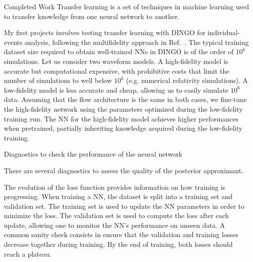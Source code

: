 \documentclass[11pt,a4paper,oneside]{book}
\numberwithin{equation}{chapter}
\numberwithin{table}{chapter}
\numberwithin{figure}{chapter}
\begin{document}
\begin{chapter}{Completed Work}
Transfer learning is a set of techniques in machine learning used to transfer knowledge from one neural network to another.

My first projects involves testing transfer learning with DINGO for individual-events analysis, following the multifidelity approach in Ref.~\cite{2025arXiv250208416K}.
The typical training dataset size required to obtain well-trained NNs in DINGO is of the order of $10^{6}$ simulations.
Let us consider two waveform models.
A high-fidelity model is accurate but computational expensive, with prohibitive costs that limit the number of simulations to well below $10^{6}$ (e.g. numerical relativity simulations).
A low-fidelity model is less accurate and cheap, allowing us to easily simulate $10^{6}$ data.
Assuming that the flow architecture is the same in both cases, we fine-tune the high-fidelity network using the parameters optimized during the low-fidelity training run.
The NN for the high-fidelity model achieves higher performances when pretrained, partially inheriting knowledge acquired during the low-fidelity training.




\begin{section}{Diagnostics to check the performance of the neural network}

There are several diagnostics to assess the quality of the posterior approximant.

The evolution of the loss function provides information on how training is progressing.
When training a NN, the dataset is split into a training set and validation set. 
The training set is used to update the NN parameters in order to minimize the loss.
The validation set is used to compute the loss after each update, allowing one to monitor the NN's performance on unseen data.
A common sanity check consists in ensure that the validation and training losses decrease together during training.
By the end of training, both losses should reach a plateau.


\end{section}
\end{chapter}
\end{document}
